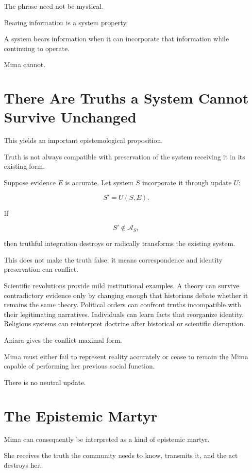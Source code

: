 \documentclass[11pt,oneside]{book}
\theoremstyle{definition}
\theoremstyle{remark}
\newcommand{\A}{\mathcal{A}}
\begin{document}
The phrase need not be mystical.

Bearing information is a system property.

A system bears information when it can incorporate that information while continuing to operate.

Mima cannot.

\section{There Are Truths a System Cannot Survive Unchanged}

This yields an important epistemological proposition.

Truth is not always compatible with preservation of the system receiving it in its existing form.

Suppose evidence \(E\) is accurate. Let system \(S\) incorporate it through update \(U\):

\[
S'=U(S,E).
\]

If

\[
S'\notin\A_S,
\]

then truthful integration destroys or radically transforms the existing system.

This does not make the truth false; it means correspondence and identity preservation can conflict.

Scientific revolutions provide mild institutional examples. A theory can survive contradictory evidence only by changing enough that historians debate whether it remains the same theory. Political orders can confront truths incompatible with their legitimating narratives. Individuals can learn facts that reorganize identity. Religious systems can reinterpret doctrine after historical or scientific disruption.

Aniara gives the conflict maximal form.

Mima must either fail to represent reality accurately or cease to remain the Mima capable of performing her previous social function.

There is no neutral update.

\section{The Epistemic Martyr}

Mima can consequently be interpreted as a kind of epistemic martyr.

She receives the truth the community needs to know, transmits it, and the act destroys her.
\end{document}
